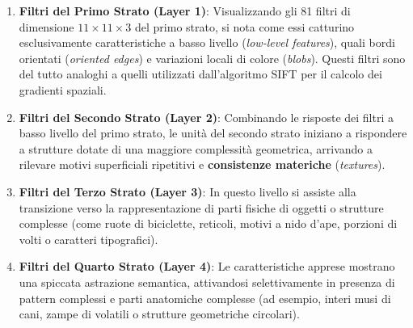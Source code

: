﻿\documentclass[11pt, a4paper]{article}
\begin{document}
\begin{enumerate}
    \item \textbf{Filtri del Primo Strato (Layer 1)}:
    Visualizzando gli 81 filtri di dimensione $11 \times 11 \times 3$ del primo strato, si nota come essi catturino esclusivamente caratteristiche a basso livello (\emph{low-level features}), quali bordi orientati (\emph{oriented edges}) e variazioni locali di colore (\emph{blobs}). Questi filtri sono del tutto analoghi a quelli utilizzati dall'algoritmo SIFT per il calcolo dei gradienti spaziali.



    \item \textbf{Filtri del Secondo Strato (Layer 2)}:
    Combinando le risposte dei filtri a basso livello del primo strato, le unità del secondo strato iniziano a rispondere a strutture dotate di una maggiore complessità geometrica, arrivando a rilevare motivi superficiali ripetitivi e \textbf{consistenze materiche} (\emph{textures}).


    \item \textbf{Filtri del Terzo Strato (Layer 3)}:
    In questo livello si assiste alla transizione verso la rappresentazione di parti fisiche di oggetti o strutture complesse (come ruote di biciclette, reticoli, motivi a nido d'ape, porzioni di volti o caratteri tipografici).


    \item \textbf{Filtri del Quarto Strato (Layer 4)}:
    Le caratteristiche apprese mostrano una spiccata astrazione semantica, attivandosi selettivamente in presenza di pattern complessi e parti anatomiche complesse (ad esempio, interi musi di cani, zampe di volatili o strutture geometriche circolari).


\end{enumerate}
\end{document}
